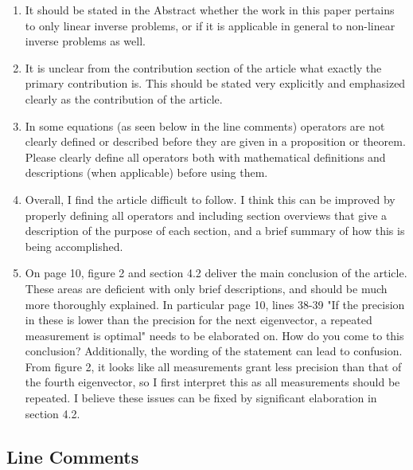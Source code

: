 \documentclass{amsart}
\begin{document}
\begin{enumerate}
\item It should be stated in the Abstract whether the work in this
  paper pertains to only linear inverse problems, or if it is
  applicable in general to non-linear inverse problems as well.
  
\item It is unclear from the contribution section of the article what
exactly the primary contribution is. This should be stated very
explicitly and emphasized clearly as the contribution of the article.

\item In some equations (as seen below in the line comments) operators
are not clearly defined or described before they are given in a
proposition or theorem. Please clearly define all operators both with
mathematical definitions and descriptions (when applicable) before
using them. 

\item Overall, I find the article difficult to follow. I think this can
be improved by properly defining all operators and including section
overviews that give a description of the purpose of each section, and
a brief summary of how this is being accomplished.

\item On page 10, figure 2 and section 4.2 deliver the main conclusion of
the article. These areas are deficient with only brief descriptions,
and should be much more thoroughly explained. In particular page 10,
lines 38-39 "If the precision in these is lower than the precision for
the next eigenvector, a repeated measurement is optimal" needs to be
elaborated on. How do you come to this conclusion? Additionally, the
wording of the statement can lead to confusion. From figure 2, it
looks like all measurements grant less precision than that of the
fourth eigenvector, so I first interpret this as all measurements
should be repeated. I believe these issues can be fixed by significant
elaboration in section 4.2.
\end{enumerate}


\subsection{Line Comments}
\end{document}
